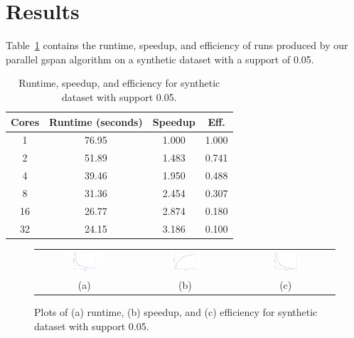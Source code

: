 \section{Results}
\label{sec:results}

Table~\ref{tab:synth} contains the runtime, speedup, and efficiency of runs
produced by our parallel gspan algorithm on a synthetic dataset with
a support of 0.05.

\begin{table}
\centering
\begin{tabular}{cccc}
\hline
Cores & Runtime (seconds) & Speedup &  Eff.  \\
\hline
1    &   76.95   &  1.000 &     1.000  \\
2    &   51.89   &  1.483 &     0.741  \\
4    &   39.46   &  1.950 &     0.488  \\
8    &   31.36   &  2.454 &     0.307  \\
16   &   26.77   &  2.874 &     0.180  \\
32   &   24.15   &  3.186 &     0.100  \\
\hline
\end{tabular}
\caption{Runtime, speedup, and efficiency for synthetic dataset with support
         0.05.}
\label{tab:synth}
\end{table}

\begin{figure}
\centering
\begin{tabular}{ccc}
\includegraphics[width=0.3\textwidth]{synth_time.png} &
\includegraphics[width=0.3\textwidth]{synth_speedup.png} &
\includegraphics[width=0.3\textwidth]{synth_efficiency.png} \\
(a) & (b) & (c) \\
\end{tabular}
\caption{Plots of (a) runtime, (b) speedup, and (c) efficiency for
         synthetic dataset with support 0.05.}
\label{fig:synth}
\end{figure}

